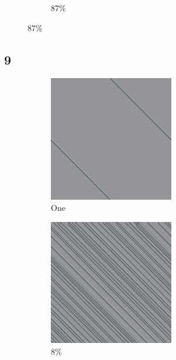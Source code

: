 \documentclass[12pt, fleqn]{report}                             %
\theoremstyle{break}                                            %
\begin{document}
\begin{figure}[ht!]
\begin{subfigure}[b]{0.4\linewidth}
          \caption{87\%}
        \end{subfigure}
      \end{figure}


      \clearpage
      \subsection{9}
      \begin{figure}[ht!]
        \centering
        \begin{subfigure}[b]{0.4\linewidth}
          \includegraphics[width=0.6\textwidth]{Images/9/a.png}
          \caption{One}
        \end{subfigure}
        \begin{subfigure}[b]{0.4\linewidth}
          \includegraphics[width=0.6\textwidth]{Images/9/b.png}
          \caption{8\%}
        \end{subfigure}
        \begin{subfigure}[b]{0.4\linewidth}

\end{subfigure}
\end{figure}
\end{document}
